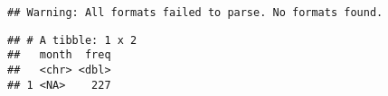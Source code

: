 \documentclass[]{article}
\newenvironment{Shaded}{\begin{snugshade}}{\end{snugshade}}
\newcommand{\KeywordTok}[1]{\textcolor[rgb]{0.13,0.29,0.53}{\textbf{#1}}}
\newcommand{\DataTypeTok}[1]{\textcolor[rgb]{0.13,0.29,0.53}{#1}}
\newcommand{\DecValTok}[1]{\textcolor[rgb]{0.00,0.00,0.81}{#1}}
\newcommand{\StringTok}[1]{\textcolor[rgb]{0.31,0.60,0.02}{#1}}
\newcommand{\OperatorTok}[1]{\textcolor[rgb]{0.81,0.36,0.00}{\textbf{#1}}}
\newcommand{\NormalTok}[1]{#1}
\begin{document}
\begin{verbatim}
## Warning: All formats failed to parse. No formats found.
\end{verbatim}

\begin{Shaded}
\end{Shaded}

\begin{verbatim}
## # A tibble: 1 x 2
##   month  freq
##   <chr> <dbl>
## 1 <NA>    227
\end{verbatim}
\end{document}
